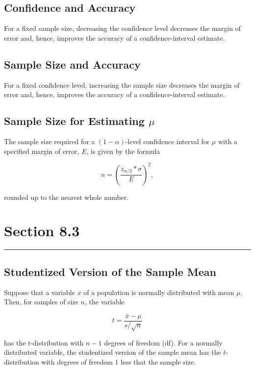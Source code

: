 \documentclass[12pt]{article}
\begin{document}
        \subsection*{Confidence and Accuracy}
            For a fixed sample size, decreasing the confidence level decreases the margin of
            error and, hence, improves the accuracy of a confidence-interval estimate.
        \subsection*{Sample Size and Accuracy}
            For a fixed confidence level, increasing the sample size decreases the margin of
            error and, hence, improves the accuracy of a confidence-interval estimate.
        \subsection*{Sample Size for Estimating $\mu$}
            The sample size required for a $(1-\alpha)$-level confidence interval for $\mu$ with
            a specified margin of error, $E$, is given by the formula
            \begin{center}
                \[
                n = (\frac{z_{\alpha/2}*\sigma}{E})^2,
                \]
            \end{center}
            rounded up to the nearest whole number.

    \section*{Section 8.3}
    \noindent\rule{\textwidth}{0.4pt}
        \subsection*{Studentized Version of the Sample Mean}
            Suppose that a variable $x$ of a population is normally distributed with mean $\mu$.
            Then, for samples of size $n$, the variable
            \begin{center}
                \[
                    t = \frac{\bar{x}-\mu}{s/\sqrt{n}}    
                \]  
            \end{center}
            has the $t$-distribution with $n-1$ degrees of freedom (df). For a normally
            distributed variable, the studentized version of the sample mean has the
            $t$-distribution with degrees of freedom 1 less that the sample size.
\end{document}

